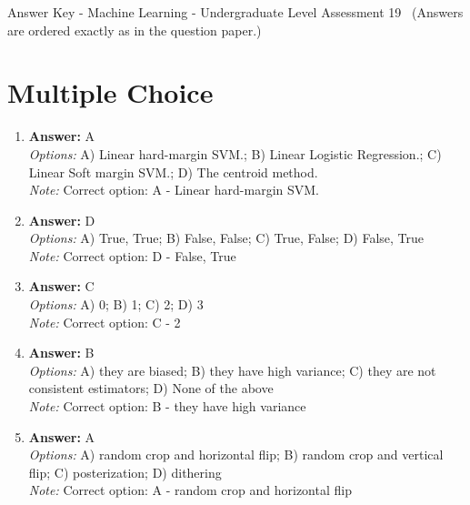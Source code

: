 \documentclass[12pt]{article}
\begin{document}
\begin{center}
Answer Key - Machine Learning - Undergraduate Level Assessment 19 \
\small (Answers are ordered exactly as in the question paper.)
\end{center}

\section*{Multiple Choice}
\begin{enumerate}[label=\arabic*.]
\item \textbf{Answer:} A
\\ \textit{Options:} A) Linear hard-margin SVM.; B) Linear Logistic Regression.; C) Linear Soft margin SVM.; D) The centroid method.
\\ \textit{Note:} Correct option: A - Linear hard-margin SVM.
\item \textbf{Answer:} D
\\ \textit{Options:} A) True, True; B) False, False; C) True, False; D) False, True
\\ \textit{Note:} Correct option: D - False, True
\item \textbf{Answer:} C
\\ \textit{Options:} A) 0; B) 1; C) 2; D) 3
\\ \textit{Note:} Correct option: C - 2
\item \textbf{Answer:} B
\\ \textit{Options:} A) they are biased; B) they have high variance; C) they are not consistent estimators; D) None of the above
\\ \textit{Note:} Correct option: B - they have high variance
\item \textbf{Answer:} A
\\ \textit{Options:} A) random crop and horizontal flip; B) random crop and vertical flip; C) posterization; D) dithering
\\ \textit{Note:} Correct option: A - random crop and horizontal flip
\end{enumerate}
\end{document}
